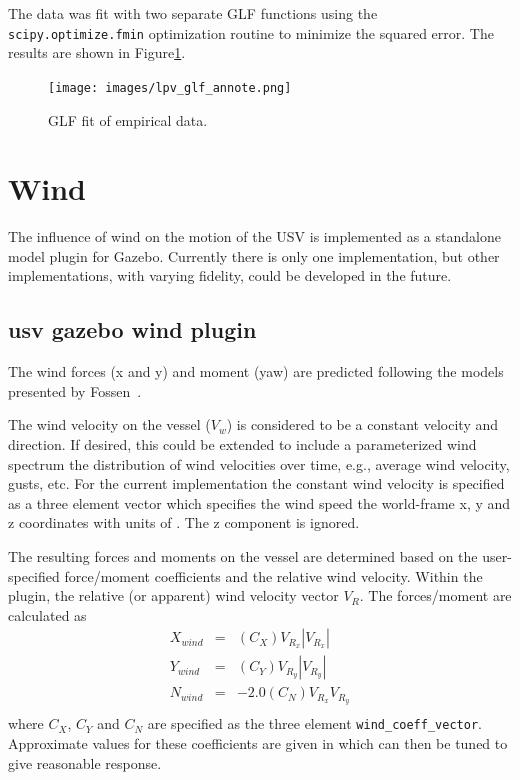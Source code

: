 \documentclass[11pt]{article}
\begin{document}
The data was fit with two separate GLF functions using the \verb+scipy.optimize.fmin+ optimization routine to minimize the squared error.  The results are shown in Figure\ref{f:fit}.

\begin{figure}[h]
  \centering
  \texttt{[image: images/lpv\_glf\_annote.png]}
  \caption{GLF fit of empirical data.}
  \label{f:fit}
\end{figure}


\section{Wind}

The influence of wind on the motion of the USV is implemented as a standalone model plugin for Gazebo.  Currently there is only one implementation, but other implementations, with varying fidelity, could be developed in the future.

\subsection{usv gazebo wind plugin}

The wind forces (x and y) and moment (yaw) are predicted following the models presented by Fossen~\cite{fossen94guidance}.

The wind velocity on the vessel ($V_w$) is considered to be a constant velocity and direction.  If desired, this could be extended to include a parameterized wind spectrum the distribution of wind velocities over time, e.g., average wind velocity, gusts, etc.  For the current implementation the constant wind velocity is specified as a three element vector which specifies the wind speed the world-frame x, y and z coordinates with units of .  The z component is ignored.

The resulting forces and moments on the vessel are determined based on the user-specified force/moment coefficients and the relative wind velocity.  Within the plugin, the relative (or apparent) wind velocity vector $V_R$.  The forces/moment are calculated as
\begin{eqnarray}
  X_{wind} &=& (C_X) V_{R_x} |V_{R_x}| \\
  Y_{wind} &=& (C_Y) V_{R_y} |V_{R_y}| \\
  N_{wind} &=& -2.0 (C_N) V_{R_x} V_{R_y} \\
\end{eqnarray}
where $C_X$, $C_Y$ and $C_N$ are specified as the three element \verb+wind_coeff_vector+.  Approximate values for these coefficients are given in \cite{sarda17station} which can then be tuned to give reasonable response.



\end{document}
